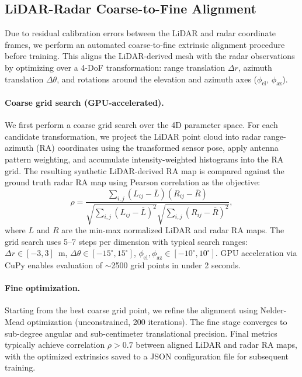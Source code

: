 \subsection{LiDAR-Radar Coarse-to-Fine Alignment}
\label{sec:supp_alignment}

Due to residual calibration errors between the LiDAR and radar coordinate frames, we perform an automated coarse-to-fine extrinsic alignment procedure before training. This aligns the LiDAR-derived mesh with the radar observations by optimizing over a 4-DoF transformation: range translation $\Delta r$, azimuth translation $\Delta\theta$, and rotations around the elevation and azimuth axes ($\phi_\text{el}$, $\phi_\text{az}$).

\paragraph{Coarse grid search (GPU-accelerated).}
We first perform a coarse grid search over the 4D parameter space. For each candidate transformation, we project the LiDAR point cloud into radar range-azimuth (RA) coordinates using the transformed sensor pose, apply antenna pattern weighting, and accumulate intensity-weighted histograms into the RA grid. The resulting synthetic LiDAR-derived RA map is compared against the ground truth radar RA map using Pearson correlation as the objective:
\begin{equation}
    \rho = \frac{\sum_{i,j} (L_{ij} - \bar{L})(R_{ij} - \bar{R})}{\sqrt{\sum_{i,j}(L_{ij} - \bar{L})^2}\sqrt{\sum_{i,j}(R_{ij} - \bar{R})^2}},
\end{equation}
where $L$ and $R$ are the min-max normalized LiDAR and radar RA maps. The grid search uses 5--7 steps per dimension with typical search ranges: $\Delta r \in [-3, 3]$~m, $\Delta\theta \in [-15^\circ, 15^\circ]$, $\phi_\text{el}, \phi_\text{az} \in [-10^\circ, 10^\circ]$. GPU acceleration via CuPy enables evaluation of $\sim$2500 grid points in under 2 seconds.

\paragraph{Fine optimization.}
Starting from the best coarse grid point, we refine the alignment using Nelder-Mead optimization (unconstrained, 200 iterations). The fine stage converges to sub-degree angular and sub-centimeter translational precision. Final metrics typically achieve correlation $\rho > 0.7$ between aligned LiDAR and radar RA maps, with the optimized extrinsics saved to a JSON configuration file for subsequent training.

